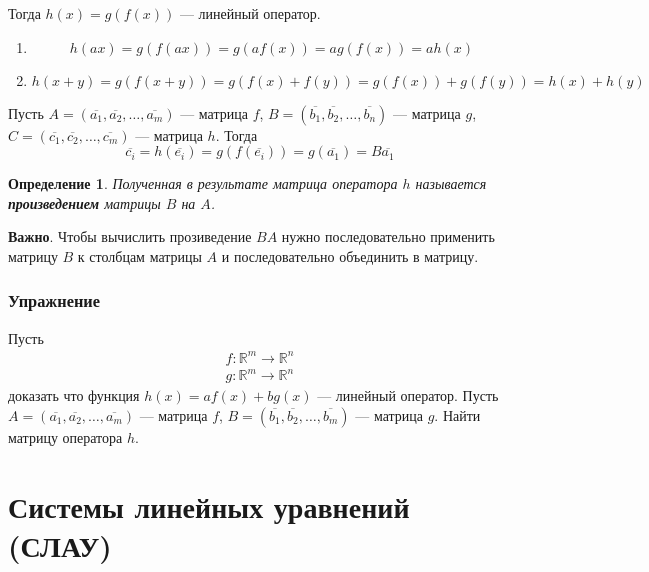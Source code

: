 \documentclass[]{article}
\newtheorem{dfn}{Определение}
\begin{document}
Тогда $h(x)=g(f(x))$ --- линейный оператор.

\begin{enumerate}
	\item
	\begin{equation*}
		h(ax)=g(f(ax))=g(af(x))=ag(f(x))=ah(x)
	\end{equation*}
	\item
\begin{equation*}
	h(x+y)=g(f(x+y))=g(f(x)+f(y))=g(f(x))+g(f(y))=h(x)+h(y)
\end{equation*}
\end{enumerate}


Пусть $A=(\overline{a_1},\overline{a_2},\ldots,\overline{a_m})$ --- матрица $f$, $B=(\overline{b_1},\overline{b_2},\ldots,\overline{b_n})$ --- матрица $g$, $C=(\overline{c_1},\overline{c_2},\ldots,\overline{c_m})$ --- матрица $h$. Тогда
\begin{equation*}
	\overline{c_i}=h(\overline{e_i})=g(f(\overline{e_i}))=g(\overline{a_1})=B\overline{a_1}
\end{equation*}

\begin{dfn}
	Полученная в результате матрица оператора $h$ называется \textbf{произведением} матрицы $B$ на $A$.
\end{dfn}

\textbf{Важно}. Чтобы вычислить прозиведение $BA$ нужно последовательно применить матрицу $B$ к столбцам матрицы $A$ и последовательно объединить в матрицу.

\subsubsection{Упражнение}
Пусть \begin{gather*}
	f:\mathbb{R}^m\rightarrow\mathbb{R}^n
	\\
	g:\mathbb{R}^m\rightarrow\mathbb{R}^n
\end{gather*}
доказать что функция $h(x)=af(x)+bg(x)$ --- линейный оператор. Пусть $A=(\overline{a_1},\overline{a_2},\ldots,\overline{a_m})$ --- матрица $f$, $B=(\overline{b_1},\overline{b_2},\ldots,\overline{b_m})$ --- матрица $g$. Найти матрицу оператора $h$.

\section{Системы линейных уравнений (СЛАУ)}
\end{document}
